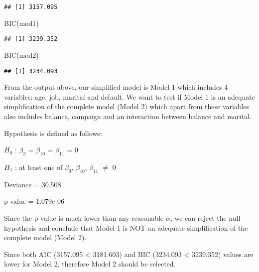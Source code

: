 \documentclass[
]{article}
\newenvironment{Shaded}{\begin{snugshade}}{\end{snugshade}}
\newcommand{\FunctionTok}[1]{\textcolor[rgb]{0.00,0.00,0.00}{#1}}
\newcommand{\NormalTok}[1]{#1}
\begin{document}
\begin{verbatim}
## [1] 3157.095
\end{verbatim}

\begin{Shaded}
\begin{Highlighting}[]
\FunctionTok{BIC}\NormalTok{(mod1)}
\end{Highlighting}
\end{Shaded}

\begin{verbatim}
## [1] 3239.352
\end{verbatim}

\begin{Shaded}
\begin{Highlighting}[]
\FunctionTok{BIC}\NormalTok{(mod2)}
\end{Highlighting}
\end{Shaded}

\begin{verbatim}
## [1] 3234.093
\end{verbatim}

From the output above, our simplified model is Model 1 which includes 4
variables: age, job, marital and default. We want to test if Model 1 is
an adequate simplification of the complete model (Model 2) which apart
from these variables also includes balance, campaign and an interaction
between balance and marital.

Hypothesis is defined as follows:

\({H_0}\) : \({\beta_3}\) = \({\beta_{10}}\) = \({\beta_{11}}\) = 0

\({H_1}\) : at least one of \({\beta_3}\), \({\beta_{10}}\),
\({\beta_{11}}\) \(\neq\) 0

Deviance = 30.508

p-value = 1.079e-06

Since the p-value is much lower than any reasonable \(\alpha\), we can
reject the null hypothesis and conclude that Model 1 is NOT an adequate
simplification of the complete model (Model 2).

Since both AIC (3157.095 \textless{} 3181.603) and BIC (3234.093
\textless{} 3239.352) values are lower for Model 2, therefore Model 2
should be selected.
\end{document}
